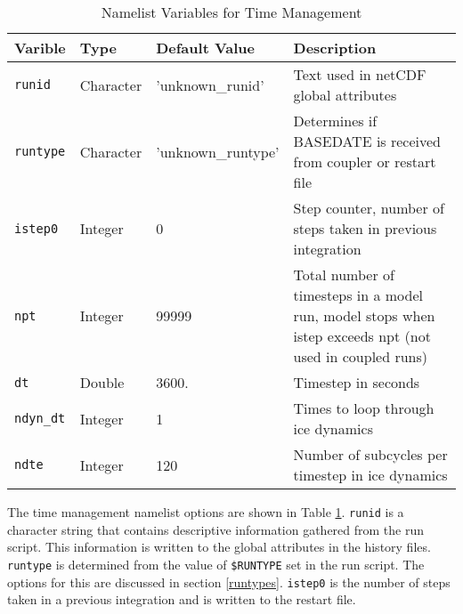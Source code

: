 \begin{table}[ht]
  \begin{center}
  \caption{Namelist Variables for Time Management}
  \label{table:nml_time}
   \begin{tabular}{p{2.0cm}p{2.0cm}p{4.0cm}p{6.5cm}} \hline
Varible  & Type & Default Value & Description               \\

\hline \hline

{\tt runid}   & Character &  'unknown\_runid' & Text used in netCDF
                                     global attributes \\

{\tt runtype} & Character &  'unknown\_runtype' & Determines if BASEDATE is
                          received from coupler or restart file   \\

{\tt istep0} &  Integer &   0   & Step counter, number of steps
                                     taken in previous integration \\

{\tt npt}    &  Integer & 99999 & Total number of timesteps in a model run,
                                    model stops when istep exceeds npt (not
                                    used in coupled runs)\\

{\tt dt}     &  Double  & 3600. & Timestep in seconds \\

{\tt ndyn\_dt}&  Integer  & 1 & Times to loop through ice dynamics \\

{\tt ndte}   &  Integer & 120   & Number of subcycles per timestep in
                                   ice dynamics \\

  \hline
  \end{tabular}
  \end{center}
\end{table}

The time management namelist options are shown in Table \ref{table:nml_time}.
{\tt runid} is a character string that contains descriptive information gathered
from the run script.  This information is written to the global attributes
in the history files.  {\tt runtype} is determined from the value of {\tt \$RUNTYPE}
set in the run script.  The options for this are discussed in section
\ref{runtypes}.  {\tt istep0} is the number of steps taken in a previous integration
and is written to the restart file. 

